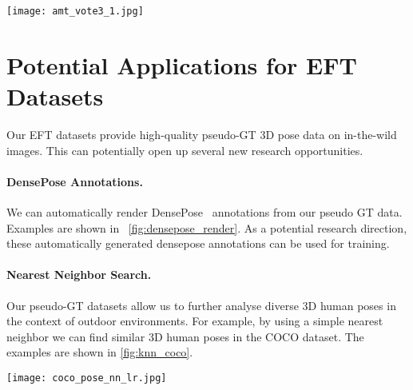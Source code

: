 \documentclass[10pt,twocolumn,letterpaper]{article}
\begin{document}
	


	\begin{figure*}[t]
		\centering
		\texttt{[image: amt\_vote3\_1.jpg]}
		\caption{The samples where our EFT outputs are favored by all three annotators. The blue meshes are the results by EFT and the pink meshes are results by SMPLify.}\label{fig:amt_vote3_1}
	\end{figure*}
	
	




	\section{Potential Applications for EFT Datasets}
	
	Our EFT datasets provide high-quality pseudo-GT 3D pose data on in-the-wild images. This can potentially open up several new research opportunities. 
	
	\paragraph{DensePose Annotations.}
	We can automatically render DensePose~\cite{guler2018densepose} annotations from our pseudo GT data. Examples are shown in ~\cref{fig:densepose_render}. As a potential research direction, these automatically generated densepose annotations can be used for training.
	
	\paragraph{Nearest Neighbor Search.}
	Our pseudo-GT datasets allow us to further analyse diverse 3D human poses in the context of outdoor environments. For example, by using a simple nearest neighbor we can find similar 3D human poses in the COCO dataset. The examples are shown in \cref{fig:knn_coco}. 

	
	\begin{figure*}[t]
		\centering
		\texttt{[image: coco\_pose\_nn\_lr.jpg]}
		\caption{Nearest Neighbor 3D Pose Search in COCO. We can find similar 3D poses by using the one in the top-left as a query (shown in blue boxes) in COCO EFT Dataset.}\label{fig:knn_coco}
	\end{figure*}
	
	
\end{document}
